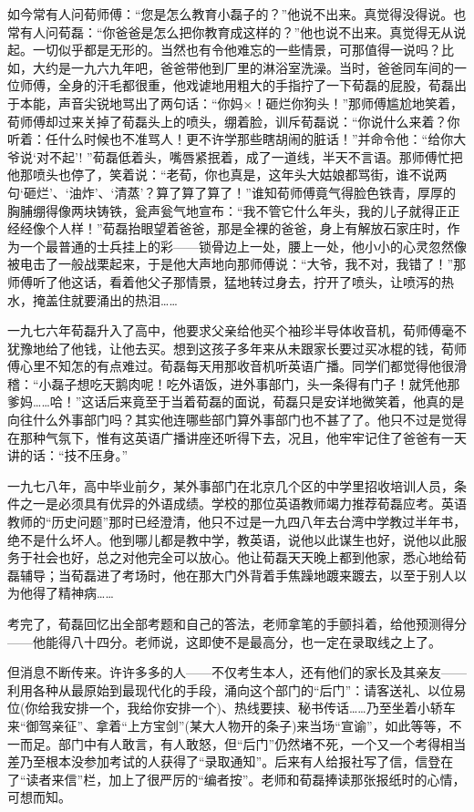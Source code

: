 \par 如今常有人问荀师傅：“您是怎么教育小磊子的？”他说不出来。真觉得没得说。也常有人问荀磊：“你爸爸是怎么把你教育成这样的？”他也说不出来。真觉得无从说起。一切似乎都是无形的。当然也有令他难忘的一些情景，可那值得一说吗？比如，大约是一九六九年吧，爸爸带他到厂里的淋浴室洗澡。当时，爸爸同车间的一位师傅，全身的汗毛都很重，他戏谑地用粗大的手指拧了一下荀磊的屁股，荀磊出于本能，声音尖锐地骂出了两句话：“你妈×！砸烂你狗头！”那师傅尴尬地笑着，荀师傅却过来关掉了荀磊头上的喷头，绷着脸，训斥荀磊说：“你说什么来着？你听着：任什么时候也不准骂人！更不许学那些瞎胡闹的脏话！”并命令他：“给你大爷说‘对不起’! ”荀磊低着头，嘴唇紧抿着，成了一道线，半天不言语。那师傅忙把他那喷头也停了，笑着说：“老荀，你也真是，这年头大姑娘都骂街，谁不说两句‘砸烂’、‘油炸’、‘清蒸’？算了算了算了！”谁知荀师傅竟气得脸色铁青，厚厚的胸脯绷得像两块铸铁，瓮声瓮气地宣布：“我不管它什么年头，我的儿子就得正正经经像个人样！”荀磊抬眼望着爸爸，那是全裸的爸爸，身上有解放石家庄时，作为一个最普通的士兵挂上的彩——锁骨边上一处，腰上一处，他小小的心灵忽然像被电击了一般战栗起来，于是他大声地向那师傅说：“大爷，我不对，我错了！”那师傅听了他这话，看着他父子那情景，猛地转过身去，拧开了喷头，让喷泻的热水，掩盖住就要涌出的热泪……
\par 一九七六年荀磊升入了高中，他要求父亲给他买个袖珍半导体收音机，荀师傅毫不犹豫地给了他钱，让他去买。想到这孩子多年来从未跟家长要过买冰棍的钱，荀师傅心里不知怎的有点难过。荀磊每天用那收音机听英语广播。同学们都觉得他很滑稽：“小磊子想吃天鹅肉呢！吃外语饭，进外事部门，头一条得有门子！就凭他那爹妈……哈！”这话后来竟至于当着荀磊的面说，荀磊只是安详地微笑着，他真的是向往什么外事部门吗？其实他连哪些部门算外事部门也不甚了了。他只不过是觉得在那种气氛下，惟有这英语广播讲座还听得下去，况且，他牢牢记住了爸爸有一天讲的话：“技不压身。”
\par 一九七八年，高中毕业前夕，某外事部门在北京几个区的中学里招收培训人员，条件之一是必须具有优异的外语成绩。学校的那位英语教师竭力推荐荀磊应考。英语教师的“历史问题”那时已经澄清，他只不过是一九四八年去台湾中学教过半年书，绝不是什么坏人。他到哪儿都是教中学，教英语，说他以此谋生也好，说他以此服务于社会也好，总之对他完全可以放心。他让荀磊天天晚上都到他家，悉心地给荀磊辅导；当荀磊进了考场时，他在那大门外背着手焦躁地踱来踱去，以至于别人以为他得了精神病……
\par 考完了，荀磊回忆出全部考题和自己的答法，老师拿笔的手颤抖着，给他预测得分——他能得八十四分。老师说，这即使不是最高分，也一定在录取线之上了。
\par 但消息不断传来。许许多多的人——不仅考生本人，还有他们的家长及其亲友——利用各种从最原始到最现代化的手段，涌向这个部门的“后门”：请客送礼、以位易位(你给我安排一个，我给你安排一个)、热线要挟、秘书传话……乃至坐着小轿车来“御驾亲征”、拿着“上方宝剑”(某大人物开的条子)来当场“宣谕”，如此等等，不一而足。部门中有人敢言，有人敢怒，但“后门”仍然堵不死，一个又一个考得相当差乃至根本没参加考试的人获得了“录取通知”。后来有人给报社写了信，信登在了“读者来信”栏，加上了很严厉的“编者按”。老师和荀磊捧读那张报纸时的心情，可想而知。
